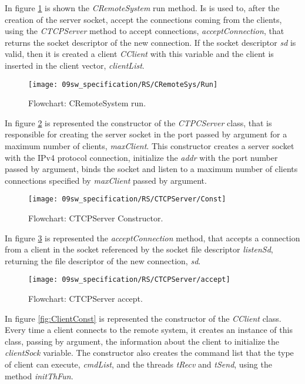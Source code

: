 In figure \ref{fig:rsRun} is shown the \textit{CRemoteSystem} run method. Is is used to, after the creation of the server socket, accept the connections coming from the clients, using the \textit{CTCPServer} method to accept connections, \textit{acceptConnection}, that returns the socket descriptor of the new connection. If the socket descriptor \textit{sd} is valid, then it is created a client \textit{CClient} with this variable and the client is inserted in the client vector, \textit{clientList}.

\begin{figure}[H]
	\centering
	\texttt{[image: 09sw\_specification/RS/CRemoteSys/Run]}
	\caption{Flowchart: CRemoteSystem run.}
	\label{fig:rsRun}
\end{figure}


In figure \ref{fig:ServerConst} is represented the constructor of the \textit{CTPCServer} class, that is responsible for creating the server socket in the port passed by argument for a maximum number of clients, \textit{maxClient}. This constructor creates a server socket with the IPv4 protocol connection, initialize the \textit{addr} with the port number passed by argument, binds the socket and listen to a maximum number of clients connections specified by \textit{maxClient} passed by argument.

\begin{figure}[H]
	\centering
	\texttt{[image: 09sw\_specification/RS/CTCPServer/Const]}
	\caption{Flowchart: CTCPServer Constructor.}
	\label{fig:ServerConst}
\end{figure}

In figure \ref{fig:acceptConn} is represented the \textit{acceptConnection} method, that accepts a connection from a client in the socket referenced by the socket file descriptor \textit{listenSd}, returning the file descriptor of the new connection, \textit{sd}.

\begin{figure}[H]
	\centering
	\texttt{[image: 09sw\_specification/RS/CTCPServer/accept]}
	\caption{Flowchart: CTCPServer accept.}
	\label{fig:acceptConn}
\end{figure}


In figure \ref{fig:ClientConst} is represented the constructor of the \textit{CClient} class. Every time a client connects to the remote system, it creates an instance of this class, passing by argument, the information about the client to initialize the \textit{clientSock} variable. The constructor also creates the command list that the type of client can execute, \textit{cmdList}, and the threads \textit{tRecv} and \textit{tSend}, using the method \textit{initThFun}.

